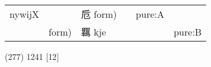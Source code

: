 \documentclass[14pt,a4paper]{scrartcl}
\begin{document}
\begin{longtable}[c]{@{}llllll@{}}
\begin{minipage}[t]{0.14\columnwidth}
nywijX
\strut\end{minipage} &
\begin{minipage}[t]{0.14\columnwidth}\raggedright\strut
\strut\end{minipage} &
\begin{minipage}[t]{0.14\columnwidth}\raggedright\strut
卮 form)
\strut\end{minipage} &
\begin{minipage}[t]{0.14\columnwidth}\raggedright\strut
\strut\end{minipage} &
\begin{minipage}[t]{0.14\columnwidth}\raggedright\strut
pure:A
\strut\end{minipage}\tabularnewline
\begin{minipage}[t]{0.14\columnwidth}\raggedright\strut
𦌭
\strut\end{minipage} &
\begin{minipage}[t]{0.14\columnwidth}\raggedright\strut
form)
\strut\end{minipage} &
\begin{minipage}[t]{0.14\columnwidth}\raggedright\strut
羈 kje
\strut\end{minipage} &
\begin{minipage}[t]{0.14\columnwidth}\raggedright\strut
\strut\end{minipage} &
\begin{minipage}[t]{0.14\columnwidth}\raggedright\strut
\strut\end{minipage} &
\begin{minipage}[t]{0.14\columnwidth}\raggedright\strut
pure:B
\strut\end{minipage}\tabularnewline
\bottomrule
\end{longtable}

(277) 1241 {[}12{]}
\end{document}
